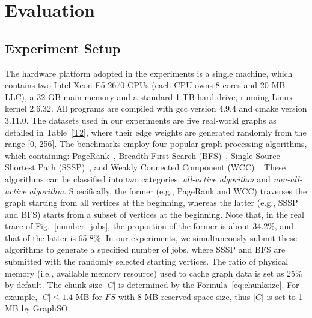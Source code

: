 \documentclass[10pt,journal,compsoc]{IEEEtran}
\begin{document}
\vspace{-8pt}
\section{Evaluation}\label{section:Evaluation}

\vspace{-2pt}
\subsection{Experiment Setup}\label{section:4.1}
\vspace{-2pt}
The hardware platform adopted in the experiments is a single machine, which contains two Intel Xeon E5-2670 CPUs (each CPU owns 8 cores and 20 MB LLC), a 32 GB main memory and a standard 1 TB hard drive, running Linux kernel 2.6.32. All programs are compiled with gcc version 4.9.4 and cmake version 3.11.0. The datasets used in our experiments are five real-world graphs as detailed in Table~\ref{T2}, where their edge weights are generated randomly from the range [0, 256].
The benchmarks employ four popular graph processing algorithms, which containing: PageRank~\cite{PageRank}, Breadth-First Search (BFS)~\cite{BFS}, Single Source Shortest Path (SSSP)~\cite{SSSP}, and Weakly Connected Component (WCC)~\cite{SCC}.
These algorithms can be classified into two categories: \textit{all-active algorithm} and \textit{non-all-active algorithm}. Specifically, the former (e.g., PageRank and WCC) traverses the graph starting from all vertices at the beginning, whereas the latter (e.g., SSSP and BFS) starts from a subset of vertices at the beginning. Note that, in the real trace of Fig.~\ref{number_jobs}, the proportion of the former is about 34.2\%, and that of the latter is 65.8\%.
In our experiments, we simultaneously submit these algorithms to generate a specified number of jobs, where SSSP and BFS are submitted with the randomly selected starting vertices. The ratio of physical memory (i.e., available memory resource) used to cache graph data is set as 25\% by default. The chunk size $|C|$ is determined by the Formula~\eqref{eq:chunksize}. For example, $|C| \le 1.4$ MB for $FS$ with 8 MB reserved space size, thus $|C|$ is set to 1 MB by GraphSO.
\end{document}
